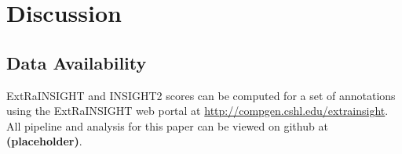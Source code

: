 \documentclass[11pt]{article}
\newcommand{\placeholder}{\textbf{(placeholder)}}
\begin{document}
\section*{Discussion}

\subsection*{Data Availability}

ExtRaINSIGHT and INSIGHT2 scores can be computed for a set of annotations using the ExtRaINSIGHT web portal at \url{http://compgen.cshl.edu/extrainsight}. All pipeline and analysis for this paper can be viewed on github at \placeholder.




\clearpage 
\end{document}
